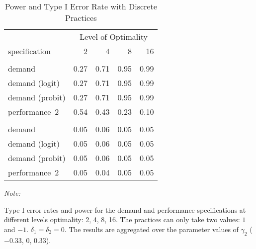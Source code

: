 \begin{table}

\caption{\label{tab:discrete-table}Power and Type I Error Rate with Discrete Practices}
\centering
\fontsize{9}{11}\selectfont
\begin{threeparttable}
\begin{tabular}[t]{lrrrr}
\toprule
\multicolumn{1}{c}{ } & \multicolumn{4}{c}{Level of Optimality} \\
\cmidrule(l{3pt}r{3pt}){2-5}
specification & 2 & 4 & 8 & 16\\
\midrule
\addlinespace[0.3em]
\multicolumn{5}{c}{\textbf{Power}}\\
\hspace{1em}demand & 0.27 & 0.71 & 0.95 & 0.99\\
\hspace{1em}demand (logit) & 0.27 & 0.71 & 0.95 & 0.99\\
\hspace{1em}demand (probit) & 0.27 & 0.71 & 0.95 & 0.99\\
\hspace{1em}performance~2 & 0.54 & 0.43 & 0.23 & 0.10\\
\addlinespace[0.3em]
\multicolumn{5}{c}{\textbf{Type I}}\\
\hspace{1em}demand & 0.05 & 0.06 & 0.05 & 0.05\\
\hspace{1em}demand (logit) & 0.05 & 0.06 & 0.05 & 0.05\\
\hspace{1em}demand (probit) & 0.05 & 0.06 & 0.05 & 0.05\\
\hspace{1em}performance~2 & 0.05 & 0.04 & 0.05 & 0.05\\
\bottomrule
\end{tabular}
\begin{tablenotes}
\item \textit{Note: } 
\item Type I error rates and power for the demand and 
  performance specifications at different levels optimality: 2,
  4, 8, 16. The practices can only take two values: $1$ and $-1$.
  $\delta_1 = \delta_2 = 0$. The results are aggregated over
  the parameter values of $\gamma_2$ ($-0.33$, $0$, $0.33$).
\end{tablenotes}
\end{threeparttable}
\end{table}